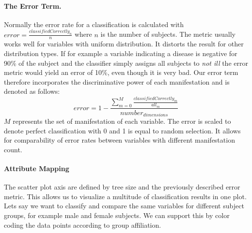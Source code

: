 \documentclass[a4paper,twoside]{style/article}
\begin{document}
\paragraph{The Error Term. }
Normally the error rate for a classification is calculated with $error = \frac{classifiedCorrectly_{n}} {n}$ where $n$ is the number of subjects.
The metric usually works well for variables with uniform distribution.
It distorts the result for other distribution types.
If for example a variable indicating a disease is negative for 90\% of the subject and the classifier simply assigns all subjects to \emph{not ill} the error metric would yield an error of 10\%, even though it is very bad.
Our error term therefore incorporates the discriminative power of each manifestation and is denoted as follows:
\begin{equation}
error = 1 - \frac{\sum_{m=0}^M \frac{classifiedCorrectly_{m}}{all_{m}}}{number_{dimensions}}
\end{equation}
$M$ represents the set of manifestation of each variable.
The error is scaled to denote perfect classification with 0 and 1 is equal to random selection.
It allows for comparability of error rates between variables with different manifestation count.

\paragraph{Attribute Mapping}
The scatter plot axis are defined by tree size and the previously described error metric.
This allows us to visualize a multitude of classification results in one plot.
Lets say we want to classify and compare the same variables for different subject groups, for example male and female subjects.
We can support this by color coding the data points according to group affiliation.
\end{document}
